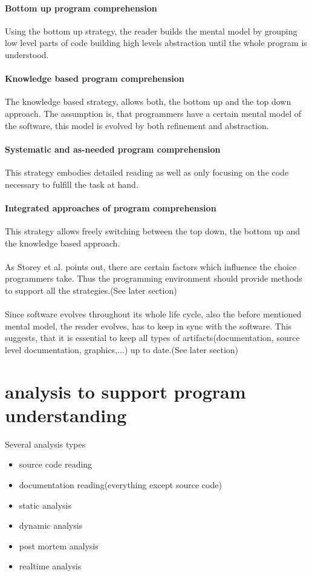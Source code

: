 \paragraph{Bottom up program comprehension} Using the bottom up strategy, the reader builds the mental model by grouping low level parts of code building high levels abstraction until the whole program is understood.
\paragraph{Knowledge based program comprehension} The knowledge based strategy, allows both, the bottom up and the top down approach. The assumption is, that programmers have a certain mental model of the software, this model is evolved by both refinement and abstraction.
\paragraph{Systematic and as-needed program comprehension} This strategy embodies detailed reading as well as only focusing on the code necessary to fulfill the task at hand.
\paragraph{Integrated approaches of program comprehension} This strategy allows freely switching between the top down, the bottom up and the knowledge based approach.
\\\\
As Storey et al.\cite{Storey:1999:CDE:308936.308940} points out, there are certain factors which influence the choice programmers take. Thus the programming environment should provide methods to support all the strategies.(See later section)
\\\\
Since software evolves throughout its whole life cycle, also the before mentioned mental model, the reader evolves, has to keep in sync with the software. This suggests, that it is essential to keep all types of artifacts(documentation, source level documentation, graphics,...) up to date.(See later section)

\section{analysis to support program understanding}

Several analysis types
\begin{itemize}
\item source code reading
\item documentation reading(everything except source code)
\item static analysis
\item dynamic analysis
\item post mortem analysis
\item realtime analysis
\end{itemize}

